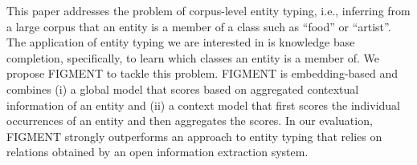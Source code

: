 This paper addresses the problem of corpus-level entity typing, i.e., inferring from a large corpus that an entity is a member of a class such as ``food'' or ``artist''. The application of entity typing we are interested in is knowledge base completion, specifically, to learn which classes an entity is a member of. We propose FIGMENT to tackle this problem. FIGMENT is embedding-based and combines (i) a global model that scores based on aggregated contextual information of an entity and (ii) a context model that first scores the individual occurrences of an entity and then aggregates the scores. In our evaluation, FIGMENT strongly outperforms an approach to entity typing that relies on relations obtained by an open information extraction system.
